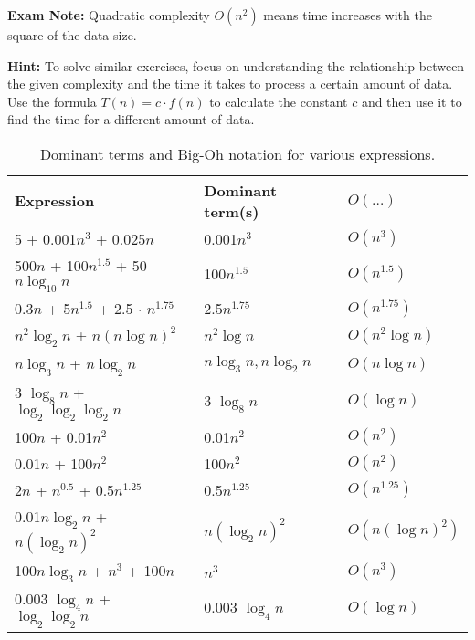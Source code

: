 \textbf{Exam Note:} Quadratic complexity $O(n^2)$ means time increases with the square of the data size.

\textbf{Hint:} To solve similar exercises, focus on understanding the relationship between the given complexity and the time it takes to process a certain amount of data. Use the formula $T(n) = c \cdot f(n)$ to calculate the constant $c$ and then use it to find the time for a different amount of data.

\FloatBarrier

\begin{table}[h]
    \centering
    \small
    \begin{tabularx}{\linewidth}{|X|X|X|}
        \hline
        Expression & Dominant term(s) & $O(\ldots)$ \\
        \hline
        5 + 0.001$n^3$ + 0.025$n$ & 0.001$n^3$ & $O(n^3)$ \\
        \hline
        500$n$ + 100$n^{1.5}$ + 50$n \log_{10} n$ & 100$n^{1.5}$ & $O(n^{1.5})$ \\
        \hline
        0.3$n$ + 5$n^{1.5}$ + 2.5 $\cdot$ $n^{1.75}$ & 2.5$n^{1.75}$ & $O(n^{1.75})$ \\
        \hline
        $n^2 \log_2 n$ + $n(n \log n)^2$ & $n^2 \log n$ & $O(n^2 \log n)$ \\
        \hline
        $n \log_3 n$ + $n \log_2 n$ & $n \log_3 n, n \log_2 n$ & $O(n \log n)$ \\
        \hline
        3 $\log_8 n$ + $\log_2 \log_2 \log_2 n$ & 3 $\log_8 n$ & $O(\log n)$ \\
        \hline
        100$n$ + 0.01$n^2$ & 0.01$n^2$ & $O(n^2)$ \\
        \hline
        0.01$n$ + 100$n^2$ & 100$n^2$ & $O(n^2)$ \\
        \hline
        2$n$ + $n^{0.5}$ + 0.5$n^{1.25}$ & 0.5$n^{1.25}$ & $O(n^{1.25})$ \\
        \hline
        0.01$n \log_2 n$ + $n(\log_2 n)^2$ & $n(\log_2 n)^2$ & $O(n(\log n)^2)$ \\
        \hline
        100$n \log_3 n$ + $n^3$ + 100$n$ & $n^3$ & $O(n^3)$ \\
        \hline
        0.003 $\log_4 n$ + $\log_2 \log_2 n$ & 0.003 $\log_4 n$ & $O(\log n)$ \\
        \hline
    \end{tabularx}
    \caption{Dominant terms and Big-Oh notation for various expressions.}
\end{table}

